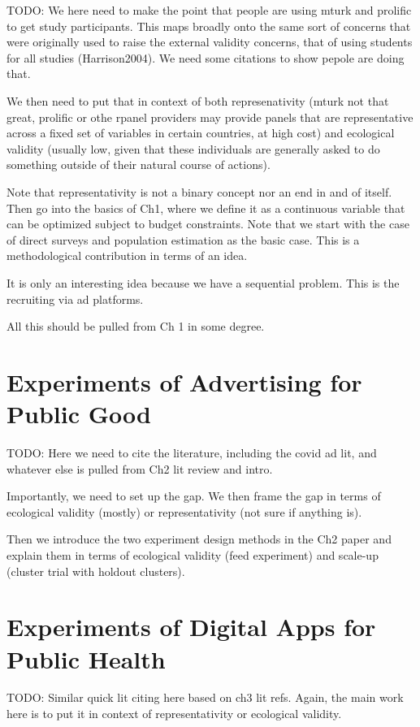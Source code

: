 TODO: We here need to make the point that people are using mturk and prolific to get study participants. This maps broadly onto the same sort of concerns that were originally used to raise the external validity concerns, that of using students for all studies (Harrison2004). We need some citations to show pepole are doing that. 

We then need to put that in context of both represenativity (mturk not that great, prolific or othe rpanel providers may provide panels that are representative across a fixed set of variables in certain countries, at high cost) and ecological validity (usually low, given that these individuals are generally asked to do something outside of their natural course of actions). 

Note that representativity is not a binary concept nor an end in and of itself. Then go into the basics of Ch1, where we define it as a continuous variable that can be optimized subject to budget constraints. Note that we start with the case of direct surveys and population estimation as the basic case. This is a methodological contribution in terms of an idea. 

It is only an interesting idea because we have a sequential problem. This is the recruiting via ad platforms. 

All this should be pulled from Ch 1 in some degree. 

\section{Experiments of Advertising for Public Good}

TODO: Here we need to cite the literature, including the covid ad lit, and whatever else is pulled from Ch2 lit review and intro. 

Importantly, we need to set up the gap. We then frame the gap in terms of ecological validity (mostly) or representativity (not sure if anything is). 

Then we introduce the two experiment design methods in the Ch2 paper and explain them in terms of ecological validity (feed experiment) and scale-up (cluster trial with holdout clusters).

\section{Experiments of Digital Apps for Public Health}

TODO: Similar quick lit citing here based on ch3 lit refs. Again, the main work here is to put it in context of representativity or ecological validity. 

